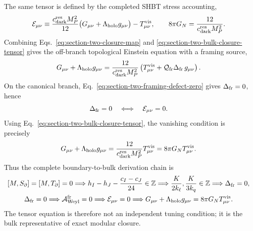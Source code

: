 \documentclass[11pt]{article}
\newcommand{\kell}{k_{\ell}}
\newcommand{\kq}{k_q}
\newcommand{\Kpar}{K}
\newcommand{\Deltafr}{\Delta_{\rm fr}}
\newcommand{\cdarkres}{c_{\rm dark}^{\rm res}}
\newcommand{\Lholo}{\Lambda_{\rm holo}}
\newcommand{\MP}{M_P}
\newcommand{\GN}{G_N}
\newcommand{\Ebulk}{\mathcal E_{\mu\nu}}
\begin{document}
The same tensor is defined by the completed SHBT stress accounting,
\begin{equation}
\label{eq:section-two-bulk-closure-tensor}
 \Ebulk
 \equiv
 \frac{\cdarkres\MP^2}{12}
 \bigl(G_{\mu\nu}+\Lholo g_{\mu\nu}\bigr)
 -T^{\rm vis}_{\mu\nu},
 \qquad
 8\pi\GN=\frac{12}{\cdarkres\MP^2}.
\end{equation}
Combining Eqs.~\eqref{eq:section-two-closure-map} and
\eqref{eq:section-two-bulk-closure-tensor} gives the off-branch
topological Einstein equation with a framing source,
\begin{equation}
\label{eq:section-two-off-branch-einstein}
 G_{\mu\nu}+\Lholo g_{\mu\nu}
 =
 \frac{12}{\cdarkres\MP^2}
 \left(T^{\rm vis}_{\mu\nu}
 +\mathcal Q_{\rm fr}\Deltafr\,g_{\mu\nu}\right).
\end{equation}
On the canonical branch, Eq.~\eqref{eq:section-two-framing-defect-zero} gives
$\Deltafr=0$, hence
\begin{equation}
\label{eq:section-two-defect-bulk-equivalence}
 \Deltafr=0
 \quad\Longleftrightarrow\quad
 \Ebulk=0.
\end{equation}
Using Eq.~\eqref{eq:section-two-bulk-closure-tensor}, the vanishing condition is
precisely
\begin{equation}
\label{eq:section-two-einstein-equivalence}
 G_{\mu\nu}+\Lholo g_{\mu\nu}
 =
 \frac{12}{\cdarkres\MP^2}T^{\rm vis}_{\mu\nu}
 =
 8\pi\GN T^{\rm vis}_{\mu\nu}.
\end{equation}
Thus the complete boundary-to-bulk derivation chain is
\begin{equation}
\label{eq:section-two-full-closure-chain}
\begin{gathered}
 [M,S_{\partial}]=[M,T_{\partial}]=0
 \Longrightarrow
 h_I-h_J-\frac{c_I-c_J}{24}\in\mathbb Z
 \Longrightarrow
 \frac{\Kpar}{2\kell},\frac{\Kpar}{3\kq}\in\mathbb Z
 \Longrightarrow
 \Deltafr=0,
\\
 \Deltafr=0
 \Longrightarrow
 \mathcal A_{\rm Weyl}^{\rm fr}=0
 \Longrightarrow
 \Ebulk=0
 \Longrightarrow
 G_{\mu\nu}+\Lholo g_{\mu\nu}
 =8\pi\GN T^{\rm vis}_{\mu\nu}.
\end{gathered}
\end{equation}
The tensor equation is therefore not an independent tuning condition; it is the
bulk representative of exact modular closure.
\end{document}
